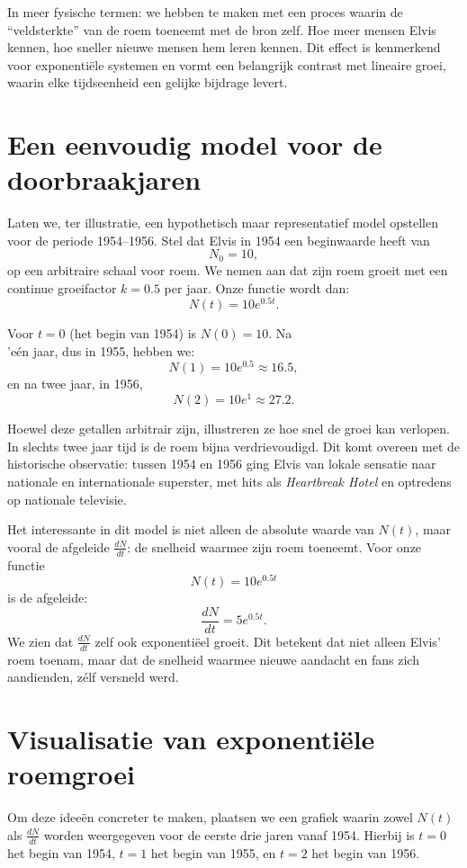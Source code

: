 \documentclass{book}
\begin{document}
	In meer fysische termen: we hebben te maken met een proces waarin de ``veldsterkte'' van de roem toeneemt met de
	bron zelf. Hoe meer mensen Elvis kennen, hoe sneller nieuwe mensen hem leren kennen. Dit effect is kenmerkend voor
	exponenti\"ele systemen en vormt een belangrijk contrast met lineaire groei, waarin elke tijdseenheid een gelijke bijdrage
	levert.
	
	\section{Een eenvoudig model voor de doorbraakjaren}
	
	Laten we, ter illustratie, een hypothetisch maar representatief model opstellen voor de periode 1954--1956. Stel dat
	Elvis in 1954 een beginwaarde heeft van
	\[
	N_0 = 10,
	\]
	op een arbitraire schaal voor roem. We nemen aan dat zijn roem groeit met een continue groeifactor $k = 0.5$ per jaar.
	Onze functie wordt dan:
	\[
	N(t) = 10 e^{0.5 t}.
	\]
	
	Voor $t = 0$ (het begin van 1954) is $N(0) = 10$. Na \\'e\'en jaar, dus in 1955, hebben we:
	\[
	N(1) = 10 e^{0.5} \approx 16.5,
	\]
	en na twee jaar, in 1956,
	\[
	N(2) = 10 e^{1} \approx 27.2.
	\]
	
	Hoewel deze getallen arbitrair zijn, illustreren ze hoe snel de groei kan verlopen. In slechts twee jaar tijd is
	de roem bijna verdrievoudigd. Dit komt overeen met de historische observatie: tussen 1954 en 1956 ging Elvis van lokale
	sensatie naar nationale en internationale superster, met hits als \emph{Heartbreak Hotel} en optredens op nationale
	televisie.
	
	Het interessante in dit model is niet alleen de absolute waarde van $N(t)$, maar vooral de afgeleide \(\frac{dN}{dt}\):
	de snelheid waarmee zijn roem toeneemt. Voor onze functie
	\[
	N(t) = 10 e^{0.5 t}
	\]
	is de afgeleide:
	\[
	\frac{dN}{dt} = 5 e^{0.5 t}.
	\]
	We zien dat \(\frac{dN}{dt}\) zelf ook exponenti\"eel groeit. Dit betekent dat niet alleen Elvis' roem toenam, maar dat de
	snelheid waarmee nieuwe aandacht en fans zich aandienden, z\'elf versneld werd.
	
	\section{Visualisatie van exponenti\"ele roemgroei}
	
	Om deze idee\"en concreter te maken, plaatsen we een grafiek waarin zowel $N(t)$ als \(\frac{dN}{dt}\) worden weergegeven
	voor de eerste drie jaren vanaf 1954. Hierbij is $t = 0$ het begin van 1954, $t = 1$ het begin van 1955, en
	$t = 2$ het begin van 1956.
	
\end{document}
